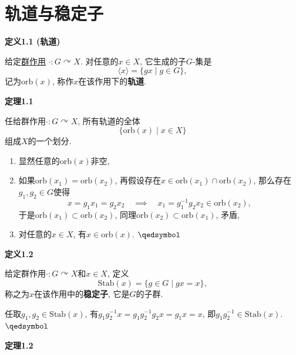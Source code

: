 \documentclass[UTF8]{ctexart}
\begin{document}
\setlength{\abovedisplayskip}{1pt}
\setlength{\belowdisplayskip}{1pt}

\section{轨道与稳定子}

\hypertarget{sec:定义1.1}{}
\noindent\textbf{定义1.1 (轨道)}

给定\href{01 群作用与 G-集#nameddest=sec:定义1.1}{群作用}
$\cdot:G\curvearrowright X$. 对任意的$x\in X$, 它生成的子$G$-集是
\[
    \langle x\rangle=\{gx\mid g\in G\},
\]
记为$\mathrm{orb}(x)$, 称作$x$在该作用下的\textbf{轨道}.

\vspace{10pt}

\hypertarget{sec:定理1.1}{}
\noindent\textbf{定理1.1}

任给群作用$\cdot:G\curvearrowright X$, 所有轨道的全体
\[
    \{\mathrm{orb}(x)\mid x\in X\}
\]
组成$X$的一个划分.


\begin{enumerate}
    \item 显然任意的$\mathrm{orb}(x)$非空,
    \item 如果$\mathrm{orb}(x_1)=\mathrm{orb}(x_2)$,
    再假设存在$x\in\mathrm{orb}(x_1)\cap\mathrm{orb}(x_2)$,
    那么存在$g_1,g_2\in G$使得
    \[
        x=g_1x_1=g_2x_2\quad\implies\quad x_1=g_1^{-1}g_2x_2\in\mathrm{orb}(x_2),
    \]
    于是$\mathrm{orb}(x_1)\subset\mathrm{orb}(x_2)$,
    同理$\mathrm{orb}(x_2)\subset\mathrm{orb}(x_1)$, 矛盾,
    \item 对任意的$x\in X$, 有$x\in\mathrm{orb}(x)$. \hfill $\qedsymbol$
\end{enumerate}

\vspace{10pt}

\hypertarget{sec:定义1.2}{}
\noindent\textbf{定义1.2}

给定群作用$\cdot:G\curvearrowright X$和$x\in X$, 定义
\[
    \mathrm{Stab}(x)=\{g\in G\mid gx=x\},
\]
称之为$x$在该作用中的\textbf{稳定子}, 它是$G$的子群.


任取$g_1,g_2\in\mathrm{Stab}(x)$, 有$g_1g_2^{-1}x=g_1g_2^{-1}g_2x=g_1x=x$,
即$g_1g_2^{-1}\in\mathrm{Stab}(x)$. \hfill $\qedsymbol$

\vspace{10pt}

\hypertarget{sec:定理1.2}{}
\noindent\textbf{定理1.2}
\end{document}
